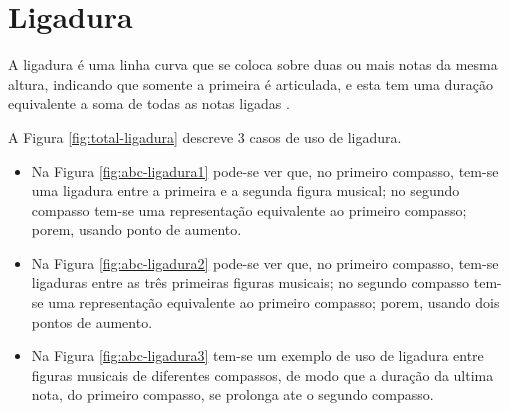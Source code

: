 
\section{Ligadura}
\label{sec:ligadura}

A ligadura é uma linha curva que se coloca sobre duas ou mais notas da mesma altura, 
indicando que somente a primeira é articulada, 
e esta tem uma duração equivalente a soma de todas as notas ligadas \cite[pp. 35]{cardoso1973curso}.

\begin{example}
A Figura \ref{fig:total-ligadura} descreve 3 casos de uso de ligadura.
\begin{itemize}
\item Na Figura \ref{fig:abc-ligadura1} pode-se ver que, no primeiro compasso, 
tem-se uma ligadura entre a primeira e a segunda figura musical; 
no segundo compasso tem-se uma representação equivalente ao primeiro compasso; 
porem, usando ponto de aumento.
\item Na Figura \ref{fig:abc-ligadura2} pode-se ver que, no primeiro compasso, 
tem-se ligaduras entre as três primeiras figuras musicais; 
no segundo compasso tem-se uma representação equivalente ao primeiro compasso; 
porem, usando dois pontos de aumento.
\item Na Figura \ref{fig:abc-ligadura3} tem-se um exemplo de uso de ligadura entre figuras musicais de diferentes compassos,
de modo que a duração da ultima nota, do primeiro compasso, se prolonga ate o segundo compasso.
\end{itemize}
\end{example}

